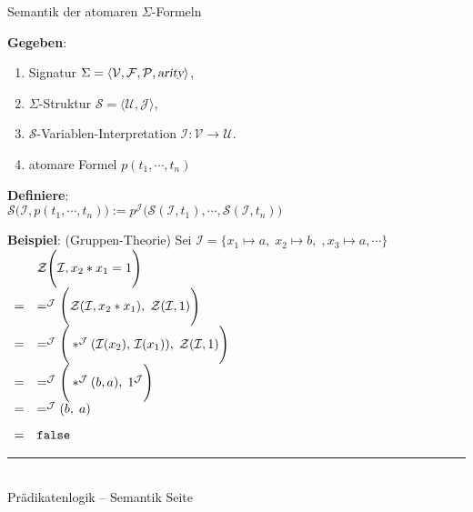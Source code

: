 \documentclass{slides}
\newcommand{\myrule}{\rule{20cm}{1mm}\\ }
\newcommand{\struct}{\mathcal{S}}
\newcounter{mypage}
\begin{document}

\begin{slide}{}
\normalsize
\begin{center}
Semantik der atomaren $\Sigma$-Formeln
\end{center}
\vspace{0.5cm}

\footnotesize
\textbf{Gegeben}: 
\begin{enumerate}
\item Signatur $\Sigma = \langle \mathcal{V}, \mathcal{F}, \mathcal{P}, \textsl{arity} \rangle$,
\item $\Sigma$-Struktur $\struct = \langle \mathcal{U}, \mathcal{J} \rangle$,
\item $\struct$-Variablen-Interpretation $\mathcal{I}: \mathcal{V} \rightarrow \mathcal{U}$.
\item atomare Formel $p(t_1, \cdots, t_n)$
\end{enumerate}
\textbf{Definiere}: \\[0.1cm]
\hspace*{1.3cm} $\struct\Bigg(\mathcal{I}, p(t_1,\cdots,t_n)\Bigg) := 
                 p^\mathcal{J}\Bigg( \struct(\mathcal{I}, t_1), \cdots, \struct(\mathcal{I}, t_n) \Bigg)$

\textbf{Beispiel}: (Gruppen-Theorie) 
Sei $\mathcal{I} = \{ x_1 \mapsto a, \; x_2 \mapsto b, \;, x_3 \mapsto a, \cdots \}$ \\[0.3cm]

\hspace*{2.0cm} 
 $
 \begin{array}[c]{cl}
  &  \mathcal{Z}\Bigg( \mathcal{I}, x_2 * x_1 = 1 \Bigg) \\[0.3cm]
= &  =^\mathcal{J}\Bigg(\mathcal{Z}(\mathcal{I}, x_2 * x_1),\;\mathcal{Z}(\mathcal{I},1)\Bigg) \\[0.3cm]
= &  =^\mathcal{J}\Bigg(*^\mathcal{J}(\mathcal{I}(x_2),\, \mathcal{I}(x_1)),\;\mathcal{Z}(\mathcal{I},1)\Bigg) \\[0.3cm]
= &  =^\mathcal{J}\Bigg(*^\mathcal{J}(b, a),\;1^\mathcal{J}\Bigg) \\[0.3cm]
= &  =^\mathcal{J}( b,\; a) \\[0.3cm]
= &  \mathtt{false} 
 \end{array}
$

\vspace*{\fill}
\tiny \addtocounter{mypage}{1}
\myrule
Prädikatenlogik -- Semantik  \hspace*{\fill} Seite 
\end{slide}
\end{document}
